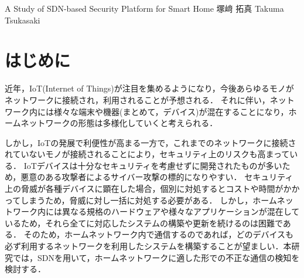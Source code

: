 \documentclass[a4paper,10pt,twocolumn,uplatex]{jsarticle}
\date{9}
\begin{document}
{A Study of SDN-based Security Platform for Smart Home}
{塚﨑 拓真}
{Takuma Tsukasaki}

\section{はじめに}
近年，IoT(Internet of Things)が注目を集めるようになり，今後あらゆるモノがネットワークに接続され，利用されることが予想される．
それに伴い，ネットワーク内には様々な端末や機器(まとめて，デバイス)が混在することになり，ホームネットワークの形態は多様化していくと考えられる．\par
しかし，IoTの発展で利便性が高まる一方で，これまでのネットワークに接続されていないモノが接続されることにより，セキュリティ上のリスクも高まっている\cite{guideline}．
IoTデバイスは十分なセキュリティを考慮せずに開発されたものが多いため，悪意のある攻撃者によるサイバー攻撃の標的になりやすい．
セキュリティ上の脅威が各種デバイスに顕在した場合，個別に対処するとコストや時間がかかってしまうため，脅威に対し一括に対処する必要がある．
しかし，ホームネットワーク内には異なる規格のハードウェアや様々なアプリケーションが混在しているため，それら全てに対応したシステムの構築や更新を続けるのは困難である．
そのため，ホームネットワーク内で通信するのであれば，どのデバイスも必ず利用するネットワークを利用したシステムを構築することが望ましい．本研究では，SDNを用いて，ホームネットワークに適した形での不正な通信の検知を検討する．

\end{document}
